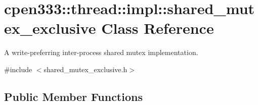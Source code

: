 \hypertarget{classcpen333_1_1thread_1_1impl_1_1shared__mutex__exclusive}{}\section{cpen333\+:\+:thread\+:\+:impl\+:\+:shared\+\_\+mutex\+\_\+exclusive Class Reference}
\label{classcpen333_1_1thread_1_1impl_1_1shared__mutex__exclusive}


A write-\/preferring inter-\/process shared mutex implementation.  




{\ttfamily \#include $<$shared\+\_\+mutex\+\_\+exclusive.\+h$>$}

\subsection*{Public Member Functions}
